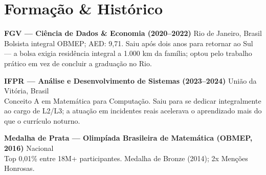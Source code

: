 \documentclass[11pt,a4paper]{article}
\begin{document}
\section{Formação \& Histórico}
\textbf{FGV --- Ciência de Dados \& Economia (2020--2022)} \hfill Rio de Janeiro, Brasil \\
Bolsista integral OBMEP; AED: 9,71. Saiu após dois anos para retornar ao Sul --- a bolsa exigia residência integral a 1.000 km da família; optou pelo trabalho prático em vez de concluir a graduação no Rio.

\textbf{IFPR --- Análise e Desenvolvimento de Sistemas (2023--2024)} \hfill União da Vitória, Brasil \\
Conceito A em Matemática para Computação. Saiu para se dedicar integralmente ao cargo de L2/L3; a atuação em incidentes reais acelerava o aprendizado mais do que o currículo noturno.

\vspace{4pt}
\textbf{Medalha de Prata --- Olimpíada Brasileira de Matemática (OBMEP, 2016)} \hfill Nacional \\
Top 0,01\% entre 18M+ participantes. Medalha de Bronze (2014); 2x Menções Honrosas.
\end{document}
